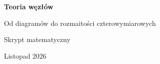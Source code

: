 \documentclass[11pt,a4paper]{report}
\numberwithin{equation}{section}
\theoremstyle{plain}
\theoremstyle{definition}
\theoremstyle{remark}
\begin{document}
\hypersetup{pageanchor=false}
\begin{titlepage}
  \centering
  \vspace*{4cm}
  {\Huge\bfseries Teoria węzłów\par}
  \vspace{0.5cm}
  {\Large Od diagramów do rozmaitości czterowymiarowych\par}
  \vspace{1.2cm}
  {\large Skrypt matematyczny\par}
  \vfill
  {\large Listopad 2026\par}
\end{titlepage}
\hypersetup{pageanchor=true}
\begingroup
\small\linespread{0.97}\selectfont
\tableofcontents
\endgroup
\clearpage
{}

\end{document}

